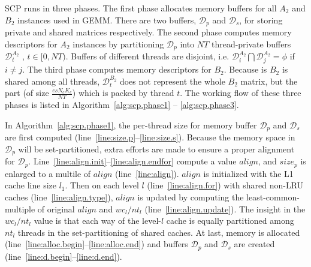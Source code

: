 SCP runs in three phases.
The first phase allocates memory buffers for all $A_2$ and $B_2$
instances used in GEMM. There are two buffers, $\mathcal{D}_p$ and $\mathcal{D}_s$,
for storing private and shared matrices respectively.
The second phase computes memory descriptors for $A_2$ instances
by partitioning $\mathcal{D}_p$ into $NT$ thread-private buffers
$\mathcal{D}_t^{A_2}$ , $t \in [0, NT)$.
Buffers of different threads are disjoint,
i.e. $\mathcal{D}_i^{A_2} \bigcap \mathcal{D}_j^{A_2} = \phi$ if $i \ne j$.
The third phase computes memory descriptors for $B_2$.
Because is $B_2$ is shared among all threads,
$\mathcal{D}_t^{B_2}$ does not represent the whole $B_2$ matrix,
but the part (of size $\frac{es N_c K_c}{NT}$) which is packed by thread $t$.
The working flow of these three phases is listed
in Algorithm~\ref{alg:scp.phase1} -- \ref{alg:scp.phase3}.

In Algorithm~\ref{alg:scp.phase1},
the per-thread size for memory buffer $\mathcal{D}_p$ and
$\mathcal{D}_s$ are first computed
(line~\ref{line:size.p}--\ref{line:size.s}).
Because the memory space in $\mathcal{D}_p$ will be set-partitioned,
extra efforts are made to ensure a proper alignment for $\mathcal{D}_p$.
Line~\ref{line:align.init}--\ref{line:align.endfor} compute a value $align$,
and $size_p$ is enlarged to a multile of $align$ (line~\ref{line:align}).
$align$ is initialized with the L1 cache line size $l_1$.
Then on each level $l$ (line~\ref{line:align.for})
with shared non-LRU caches (line~\ref{line:align.type}),
$align$ is updated by computing the least-common-multiple of
original $align$ and $wc_l/nt_l$ (line~\ref{line:align.update}).
The insight in the $wc_l/nt_l$ value is that
each way of the level-$l$ cache is equally partitioned among $nt_l$ threads
in the set-partitioning of shared caches.
At last, memory is allocated (line~\ref{line:alloc.begin}--\ref{line:alloc.end})
and buffers $\mathcal{D}_p$ and $\mathcal{D}_s$
are created (line~\ref{line:d.begin}--\ref{line:d.end}).

